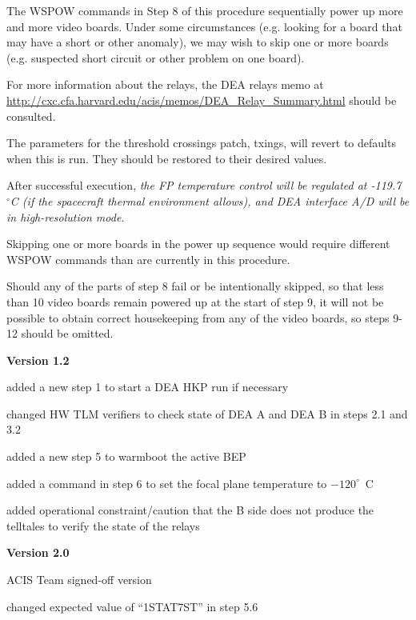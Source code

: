 \documentclass[11pt]{article}
\begin{document}
The WSPOW commands in Step 8 of this procedure sequentially power up more and more 
video boards. Under some circumstances (e.g. looking for a board that may have a 
short or other anomaly), we may wish to skip one or more boards (e.g. suspected 
short circuit or other problem on one board). 

For more information about the relays, the DEA relays memo at 
\url{http://cxc.cfa.harvard.edu/acis/memos/DEA_Relay_Summary.html} should be 
consulted.

The parameters for the threshold crossings patch, txings, will revert to defaults 
when this is run. They should be restored to their desired values.

After successful execution, {\em the FP temperature control will be regulated at 
-119.7~$^\circ$C (if the spacecraft thermal environment allows), and DEA interface 
A/D will be in high-resolution mode.}

Skipping one or more boards in the power up sequence would require different 
WSPOW commands than are currently in this procedure.

Should any of the parts of step 8 fail or be intentionally skipped, so that less 
than 10 video boards remain powered up at the start of step 9, it will not be 
possible to obtain correct housekeeping from any of the video boards, so steps 
9-12 should be omitted.
\\

\newpage


\bd
\item {\bf Version 1.2}
\bi
\item added a new step 1 to start a DEA HKP run if necessary
\item changed HW TLM verifiers to check state of DEA A and DEA B in
steps 2.1 and 3.2
\item added a new step 5 to warmboot the active BEP
\item added a command in step 6 to set the focal plane temperature to
$-120^\circ$~C
\item added operational constraint/caution that the B side does not
produce the telltales to verify the state of the relays
\ei

\item {\bf Version 2.0}
\bi
\item ACIS Team signed-off version
\item changed expected value of ``1STAT7ST'' in step 5.6
\ei
\end{document}
